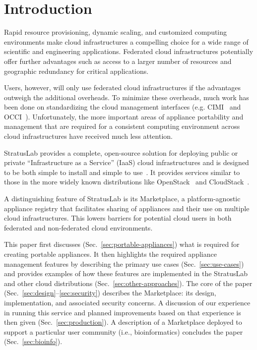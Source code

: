 \section{Introduction}
\label{sec:Introduction}

Rapid resource provisioning, dynamic scaling, and customized computing
environments make cloud infrastructures a compelling choice for a wide
range of scientific and engineering applications.  Federated cloud
infrastructures potentially offer further advantages such as access to
a larger number of resources and geographic redundancy for critical
applications.

Users, however, will only use federated cloud infrastructures if the
advantages outweigh the additional overheads.  To minimize these
overheads, much work has been done on standardizing the cloud
management interfaces (e.g. CIMI~\cite{cimi} and OCCI~\cite{occi}).
Unfortunately, the more important areas of appliance portability and
management that are required for a consistent computing environment
across cloud infrastructures have received much less attention.

StratusLab provides a complete, open-source solution for deploying
public or private ``Infrastructure as a Service'' (IaaS) cloud
infrastructures and is designed to be both simple to install and
simple to use~\cite{slbook}. It provides services similar to those in
the more widely known distributions like OpenStack~\cite{openstack}
and CloudStack~\cite{cloudstack}.

A distinguishing feature of StratusLab is its Marketplace, a
platform-agnostic appliance registry that facilitates sharing of
appliances and their use on multiple cloud infrastructures.  This
lowers barriers for potential cloud users in both federated and
non-federated cloud environments.

This paper first discusses (Sec.~\ref{sec:portable-appliances}) what
is required for creating portable appliances. It then highlights the
required appliance management features by describing the primary use
cases (Sec.~\ref{sec:use-cases}) and provides examples of how these
features are implemented in the StratusLab and other cloud
distributions (Sec.~\ref{sec:other-approaches}).  The core of the
paper (Sec.~\ref{sec:design}--\ref{sec:security}) describes the
Marketplace: its design, implementation, and associated security
concerns.  A discussion of our experience in running this service and
planned improvements based on that experience is then given
(Sec.~\ref{sec:production}). A description of a Marketplace 
deployed to support a particular user community (i.e., bioinformatics)
 concludes the paper (Sec.~\ref{sec:bioinfo}).
